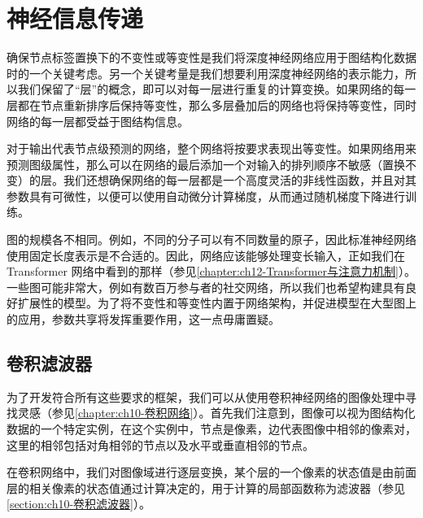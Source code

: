 \documentclass[../../main.tex]{subfiles}
\begin{document}
\section{神经信息传递}\label{section:ch13-神经信息传递}

确保节点标签置换下的不变性或等变性是我们将深度神经网络应用于图结构化数据时的一个关键考虑。另一个关键考量是我们想要利用深度神经网络的表示能力，所以我们保留了“层”的概念，即可以对每一层进行重复的计算变换。如果网络的每一层都在节点重新排序后保持等变性，那么多层叠加后的网络也将保持等变性，同时网络的每一层都受益于图结构信息。

对于输出代表节点级预测的网络，整个网络将按要求表现出等变性。如果网络用来预测图级属性，那么可以在网络的最后添加一个对输入的排列顺序不敏感（置换不变）的层。我们还想确保网络的每一层都是一个高度灵活的非线性函数，并且对其参数具有可微性，以便可以使用自动微分计算梯度，从而通过随机梯度下降进行训练。

图的规模各不相同。例如，不同的分子可以有不同数量的原子，因此标准神经网络使用固定长度表示是不合适的。因此，网络应该能够处理变长输入，正如我们在 Transformer 网络中看到的那样（参见\cref{chapter:ch12-Transformer与注意力机制}）。一些图可能非常大，例如有数百万参与者的社交网络，所以我们也希望构建具有良好扩展性的模型。为了将不变性和等变性内置于网络架构，并促进模型在大型图上的应用，参数共享将发挥重要作用，这一点毋庸置疑。

\subsection{卷积滤波器}\label{subsection:ch13-卷积滤波器}

为了开发符合所有这些要求的框架，我们可以从使用卷积神经网络的图像处理中寻找灵感（参见\cref{chapter:ch10-卷积网络}）。首先我们注意到，图像可以视为图结构化数据的一个特定实例，在这个实例中，节点是像素，边代表图像中相邻的像素对，这里的相邻包括对角相邻的节点以及水平或垂直相邻的节点。

在卷积网络中，我们对图像域进行逐层变换，某个层的一个像素的状态值是由前面层的相关像素的状态值通过计算决定的，用于计算的局部函数称为滤波器（参见\cref{section:ch10-卷积滤波器}）。
\end{document}
